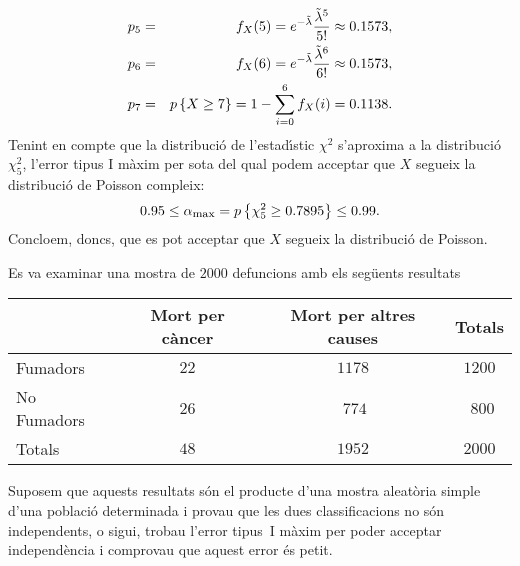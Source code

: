 {\begin{eqnarray*}
p_5 & = & f_X (5) =e^{-\tilde{\lambda}} \frac{\tilde{\lambda}^5}{5!} \approx 
0.1573, \\
p_6 & = & f_X (6) =e^{-\tilde{\lambda}} \frac{\tilde{\lambda}^6}{6!} \approx 
0.1573, \\
p_7  & = & p\left\{X\geq 7\right\}=1-\sum\limits_{i=0}^6 f_X(i) = 0.1138.
\end{eqnarray*}
Tenint en compte que la distribuci\'o de l'estad\'{\i}stic 
$\chi^2$ s'aproxima a la distribuci\'o $\chi_5^2$, l'error tipus I m\`axim 
per sota del qual podem acceptar
que $X$ segueix la distribuci\'o de Poisson
compleix:
\[
0.95\leq\alpha_{\mbox{\footnotesize max}}=p\left\{\chi_5^2\geq 0.7895\right\}
\leq 0.99.
\]
Concloem, doncs, que es pot acceptar que $X$ segueix la distribuci\'o de
Poisson.
}

\begin{probres}
{Es va examinar una mostra de $2000$ defuncions amb els seg\"uents resultats
\begin{center}
\begin{tabular}{|l||c|c||c|}
\hline &Mort per
c\`ancer&Mort per altres
causes&Totals\\\hline\hline Fumadors&$22$&$1178$&$1200$
\\\hline No Fumadors&$26$&$\ 774$&$\ \,800$
\\\hline Totals&$48$&$1952$&$2000$\\\hline 
\end{tabular}
\end{center}

Suposem que
aquests resultats s\'on el producte d'una mostra aleat\`oria 
simple d'una poblaci\'o determinada i
provau que les dues classificacions no s\'on independents,
 o sigui, trobau l'error
tipus~I m\`axim per poder acceptar independ\`encia i comprovau que aquest 
error \'es petit.}
\end{probres} 

